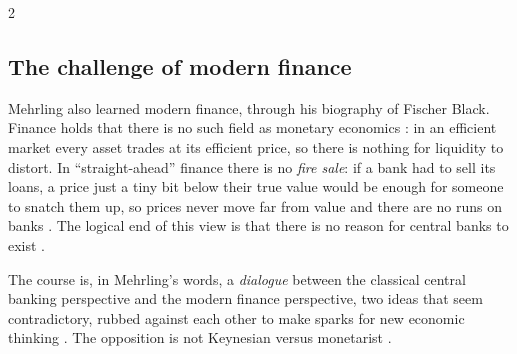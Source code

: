 \begin{paracol}{2}
\subsection{The challenge of modern finance}
Mehrling also learned modern finance, through his biography of Fischer Black. Finance holds that there
is no such field as monetary economics : in an efficient market every asset trades at its
efficient price, so there is nothing for liquidity to distort. In ``straight-ahead'' finance there is no
\emph{fire sale}: if a bank had to sell its loans, a price just a tiny bit below their true value would be
enough for someone to snatch them up, so prices never move far from value and there are no runs on banks
. The logical end of this view is that there is no reason for central banks to exist
.

The course is, in Mehrling's words, a \emph{dialogue} between the classical central banking perspective and
the modern finance perspective, two ideas that seem contradictory, rubbed against each other to make
sparks for new economic thinking . The opposition is not Keynesian versus monetarist
.


\end{paracol}
